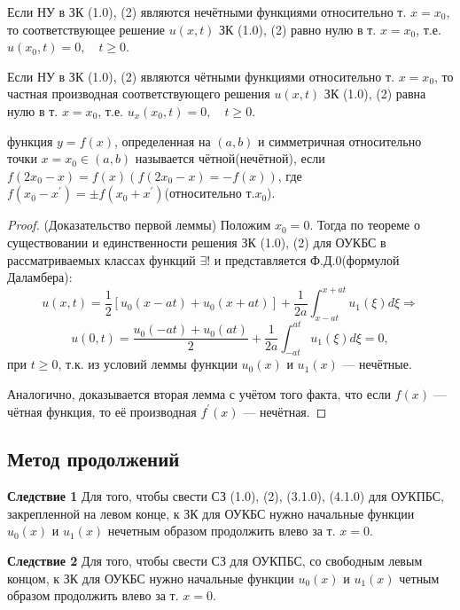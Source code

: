 \begin{lemma}
	Если НУ в ЗК (1.0), (2) являются нечётными функциями относительно т. $x=x_0$, то соответствующее решение $u(x, t)$ ЗК (1.0), (2) равно нулю в т. $x=x_0$, т.е. $u(x_0, t) = 0,\quad t \ge 0$.
\end{lemma}

\begin{lemma}
	Если НУ в ЗК (1.0), (2) являются чётными функциями относительно т. $x=x_0$, то частная производная соответствующего решения $u(x, t)$ ЗК (1.0), (2) равна нулю в т. $x=x_0$, т.е. $u_x(x_0, t) = 0,\quad t \ge 0$.
\end{lemma}

\begin{note}
	функция $y = f(x)$, определенная на $(a, b)$ и симметричная относительно точки $x=x_0 \in (a, b)$ называется чётной(нечётной), если $f(2x_0 - x) = f(x)(f(2x_0 - x) = -f(x))$, где $f(x_0 - x^{'}) = \pm f(x_0 + x^{'})$(относительно т.$x_0$).
\end{note}

\begin{proof}
	(Доказательство первой леммы)
	Положим $x_0 = 0$. Тогда по теореме о существовании и единственности решения ЗК (1.0), (2) для ОУКБС в рассматриваемых классах функций $\exists!$ и представляется Ф.Д.0(формулой Даламбера):
	\[
		u(x, t) = \frac{1}{2} [u_0(x-at) + u_0(x+at)] + \frac{1}{2a}\int_{x-at}^{x+at}u_1(\xi)d\xi \Rightarrow
	\]
	\[
		u(0, t) = \frac{u_0(-at)+u_0(at)}{2} + \frac{1}{2a} \int_{-at}^{at} u_1(\xi)d\xi = 0,
	\]
	при $t \ge 0$, т.к. из условий леммы функции $u_0(x)$ и $u_1(x)$ --- нечётные.

	Аналогично, доказывается вторая лемма с учётом того факта, что если $f(x)$ --- чётная функция, то её производная $f^{'}(x)$ --- нечётная.
\end{proof}

\subsection{Метод продолжений}

\textbf{Следствие 1} Для того, чтобы свести СЗ (1.0), (2), (3.1.0), (4.1.0) для ОУКПБС, закрепленной на левом конце, к ЗК для ОУКБС нужно начальные функции $u_0(x)$ и $u_1(x)$ нечетным образом продолжить влево за т. $x=0$.

\textbf{Следствие 2} Для того, чтобы свести СЗ для ОУКПБС, со свободным левым концом, к ЗК для ОУКБС нужно начальные функции $u_0(x)$ и $u_1(x)$ четным образом продолжить влево за т. $x=0$.

